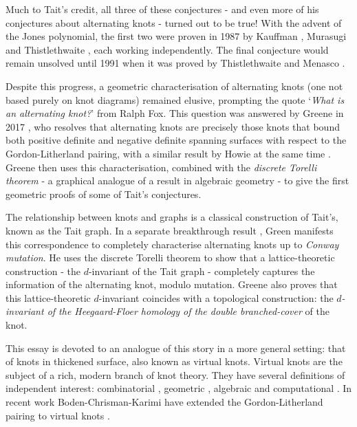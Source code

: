 \documentclass[12pt]{report}
\theoremstyle{upright}
\begin{document}
Much to Tait's credit, all three of these conjectures - and even more of his conjectures about alternating knots - turned out to be true! With the advent of the Jones polynomial, the first two were proven in 1987 by Kauffman \cite{state-models-jones-polynomial}, Murasugi \cite{jones-polynomials-classical-conjectures} and Thistlethwaite \cite{spanning-tree-expansion-jones-polynomial}, each working independently. The final conjecture would remain unsolved until 1991 when it was proved by Thistlethwaite and Menasco \cite{classification-alternating-links}.

Despite this progress, a geometric characterisation of alternating knots (one not based purely on knot diagrams) remained elusive, prompting the quote `\textit{What is an alternating knot?}' from Ralph Fox. This question was answered by Greene in 2017 \cite{alternating-links-definite-surfaces}, who resolves that alternating knots are precisely those knots that bound both positive definite and negative definite spanning surfaces with respect to the Gordon-Litherland pairing, with a similar result by Howie at the same time \cite{characterisation-alternating-knot-exteriors}. Greene then uses this characterisation, combined with the \textit{discrete Torelli theorem} - a graphical analogue of a result in algebraic geometry - to give the first geometric proofs of some of Tait's conjectures.

The relationship between knots and graphs is a classical construction of Tait's, known as the Tait graph. In a separate breakthrough result \cite{lattices-graphs-mutation}, Green manifests this correspondence to completely characterise alternating knots up to \textit{Conway mutation}. He uses the discrete Torelli theorem to show that a lattice-theoretic construction - the $d$-invariant of the Tait graph - completely captures the information of the alternating knot, modulo mutation. Greene also proves that this lattice-theoretic $d$-invariant coincides with a topological construction: the \textit{$d$-invariant of the Heegaard-Floer homology of the double branched-cover} of the knot.

This essay is devoted to an analogue of this story in a more general setting: that of knots in thickened surface, also known as virtual knots. Virtual knots are the subject of a rich, modern branch of knot theory. They have several definitions of independent interest: combinatorial \cite{virtual-knot-theory, finite-type-invariants-classical-virtual}, geometric \cite{what-is-a-virtual-link, stable-equivalence-virtual-cobordisms}, algebraic \cite{w-knotted-i, w-knotted-ii} and computational \cite{virtual-knot-theory}. In recent work Boden-Chrisman-Karimi have extended the Gordon-Litherland pairing to virtual knots \cite{gordon-litherland-pairing-thickened-surfaces}.
\end{document}
